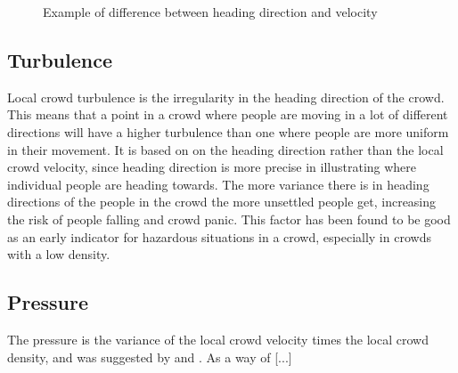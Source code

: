 \begin{figure}\centering
{}
\caption{Example of difference between heading direction and velocity}
\label{fig:headingvsvelocity}
\end{figure}

\subsection{Turbulence}
\label{sub:crowdFactorTurbulence}
Local crowd turbulence is the irregularity in the heading direction of the crowd. This means that a point in a crowd where people are moving in a lot of different directions will have a higher turbulence than one where people are more uniform in their movement. It is based on on the heading direction rather than the local crowd velocity, since heading direction is more precise in illustrating where individual people are heading towards. The more variance there is in heading directions of the people in the crowd the more unsettled people get, increasing the risk of people falling and crowd panic. This factor has been found to be good as an early indicator for hazardous situations in a crowd, especially in crowds with a low density\cite{wirz2012inferring}.


\subsection{Pressure}
The pressure is the variance of the local crowd velocity times the local crowd density, and was suggested by \citeauthor{empircalstudy} \citeyearpar{empircalstudy} \cite{empircalstudy} and \citeauthor{videoanalysis} \citeyearpar{videoanalysis} \cite{videoanalysis}. As a way of [...] 

